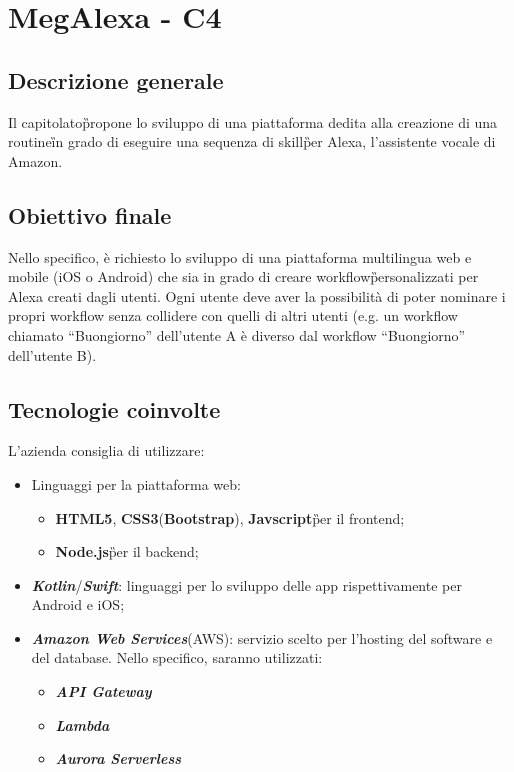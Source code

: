 \section{MegAlexa - C4} \label{c4}

    \subsection{Descrizione generale}
    Il capitolato\G propone lo sviluppo di una piattaforma
    dedita alla creazione di una routine\G in grado di eseguire una sequenza
    di skill\G per Alexa\GAlt, l'assistente vocale di Amazon.

    \subsection{Obiettivo finale}
    Nello specifico, \`e richiesto lo sviluppo di una piattaforma multilingua web e
    mobile (iOS o Android) che sia in grado di
    creare workflow\G personalizzati per Alexa creati dagli utenti. Ogni utente
    deve aver la possibilit\`a di poter nominare i propri workflow senza collidere con
    quelli di altri utenti (e.g. un workflow chiamato ``Buongiorno'' dell'utente A \`e
    diverso dal workflow ``Buongiorno'' dell'utente B).

    \subsection{Tecnologie coinvolte}
    L'azienda consiglia di utilizzare:
    \begin{itemize}
    	\item Linguaggi per la piattaforma web:
    	\begin{itemize}
            \item \textbf{HTML5}\GAlt, \textbf{CSS3}\GAlt (\textbf{Bootstrap}\GAlt), \textbf{Javscript}\G
                per il frontend;
            \item \textbf{Node.js}\G per il backend;
    	\end{itemize}
        \item \textit{\textbf{Kotlin}}\GAlt /\textit{\textbf{Swift}}\GAlt: linguaggi per lo sviluppo delle app
            rispettivamente per Android e iOS;
        \item \textit{\textbf{Amazon Web Services}}\GAlt (AWS): servizio scelto per l'hosting del software e del database.
            Nello specifico, saranno utilizzati:
            \begin{itemize}
                \item \textit{\textbf{API Gateway}}\GAlt
                \item \textit{\textbf{Lambda}}\GAlt
                \item \textit{\textbf{Aurora Serverless}}\GAlt
            \end{itemize}
    \end{itemize}

